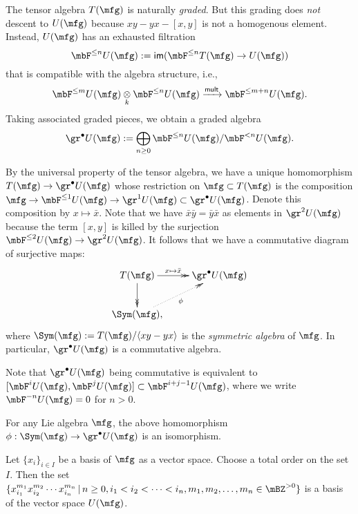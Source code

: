 \begin{constr}
	The tensor algebra $T(\mfg)$ is naturally \emph{graded}. But this grading does \emph{not} descent to $U(\mfg)$ because $xy-yx-[x,y]$ is not a homogenous element. Instead, $U(\mfg)$ has an exhausted filtration
	\[
		\mbF^{\le n} U(\mfg) := \mathsf{im}( \mbF^{\le n} T(\mfg) \to U(\mfg) )
	\]
	that is compatible with the algebra structure, i.e.,
	\[
		\mbF^{\le m} U(\mfg) \ot_k \mbF^{\le n} U(\mfg) \xrightarrow{\mathsf{mult}} \mbF^{\le {m+n}} U(\mfg) .
 	\]
 	Taking associated graded pieces, we obtain a graded algebra 
 	\[
 		\gr^\bullet U(\mfg) := \bigoplus_{n\ge 0} \mbF^{\le n} U(\mfg) / \mbF^{<n} U(\mfg).
 	\]

 	By the universal property of the tensor algebra, we have a unique homomorphism $T(\mfg) \to \gr^\bullet U(\mfg)$ whose restriction on $\mfg\subset T(\mfg)$ is the composition $\mfg \to \mbF^{\le 1}U(\mfg) \to \gr^1 U(\mfg) \subset \gr^\bullet U(\mfg)$. Denote this composition by $x\mapsto \bar{x}$. Note that we have $\bar{x}\bar{y} = \bar{y} \bar{x}$ as elements in $\gr^2U(\mfg)$ because the term $[x,y]$ is killed by the surjection $\mbF^{\le 2}U(\mfg) \to \gr^2 U(\mfg)$. It follows that we have a commutative diagram of surjective maps:
 	\[
 		\xymatrix{
 			T(\mfg) \ar@{->>}[r]^-{x\mapsto \bar{x}} \ar@{->>}[d] &
 			\gr^\bullet U(\mfg) \\
 			\Sym(\mfg), \ar@{.>>}[ru]_-\phi
 		}
 	\]
 	where $\Sym(\mfg):= T(\mfg)/\langle xy-yx \rangle $ is the \emph{symmetric algebra} of $\mfg$. In particular, $\gr^\bullet U(\mfg)$ is a commutative algebra.

\end{constr}

\begin{rem}
	Note that $\gr^\bullet U(\mfg)$ being commutative is equivalent to $[\mbF^i U(\mfg), \mbF^j U(\mfg)] \subset \mbF^{i+j-1} U(\mfg)$, where we write $\mbF^{-n}U(\mfg)=0$ for $n>0$.

\end{rem}

\begin{thm}
 	For any Lie algebra $\mfg$, the above homomorphism $\phi:\Sym(\mfg)\to  \gr^\bullet U(\mfg)$ is an isomorphism.
\end{thm}

\begin{cor}
	\label{cor-basis-Ug}
	Let $\{x_i\}_{i\in I}$ be a basis of $\mfg$ as a vector space. Choose a total order on the set $I$. Then the set 
	$\{ x_{i_1}^{m_1} x_{i_2}^{m_2} \cdots x_{i_n}^{m_n} \,\vert\, n\ge 0, i_1<i_2<\cdots <i_n, m_1,m_2,\dots,m_n\in \mBZ^{>0} \}$ is a basis of the vector space $U(\mfg)$.
\end{cor}


